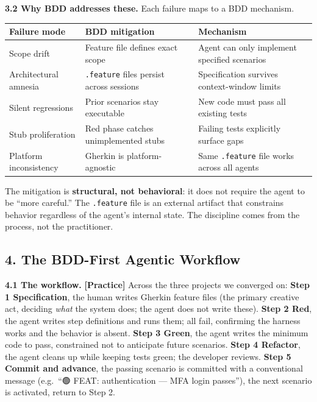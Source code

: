 \textbf{3.2 Why BDD addresses these.} Each failure maps to a BDD
mechanism.

{\def\LTcaptype{none} %
\begin{longtable}[]{@{}
  >{\raggedright\arraybackslash}p{}
  >{\raggedright\arraybackslash}p{}
  >{\raggedright\arraybackslash}p{}@{}}
\toprule\noalign{}
\begin{minipage}[b]{\linewidth}\raggedright
Failure mode
\end{minipage} & \begin{minipage}[b]{\linewidth}\raggedright
BDD mitigation
\end{minipage} & \begin{minipage}[b]{\linewidth}\raggedright
Mechanism
\end{minipage} \\
\midrule\noalign{}
\endhead
\bottomrule\noalign{}
\endlastfoot
Scope drift & Feature file defines exact scope & Agent can only
implement specified scenarios \\
Architectural amnesia & \texttt{.feature} files persist across sessions
& Specification survives context-window limits \\
Silent regressions & Prior scenarios stay executable & New code must
pass all existing tests \\
Stub proliferation & Red phase catches unimplemented stubs & Failing
tests explicitly surface gaps \\
Platform inconsistency & Gherkin is platform-agnostic & Same
\texttt{.feature} file works across all agents \\
\end{longtable}
}

The mitigation is \textbf{structural, not behavioral}: it does not
require the agent to be ``more careful.'' The \texttt{.feature} file is
an external artifact that constrains behavior regardless of the agent's
internal state. The discipline comes from the process, not the
practitioner.

\subsection{4. The BDD-First Agentic
Workflow}\label{the-bdd-first-agentic-workflow}

\textbf{4.1 The workflow.} \textbf{{[}Practice{]}} Across the three
projects we converged on: \textbf{Step 1 Specification}, the human
writes Gherkin feature files (the primary creative act, deciding
\emph{what} the system does; the agent does not write these).
\textbf{Step 2 Red}, the agent writes step definitions and runs them;
all fail, confirming the harness works and the behavior is absent.
\textbf{Step 3 Green}, the agent writes the minimum code to pass,
constrained not to anticipate future scenarios. \textbf{Step 4
Refactor}, the agent cleans up while keeping tests green; the developer
reviews. \textbf{Step 5 Commit and advance}, the passing scenario is
committed with a conventional message (e.g.~``🟢 FEAT: authentication
--- MFA login passes''), the next scenario is activated, return to Step
2.

